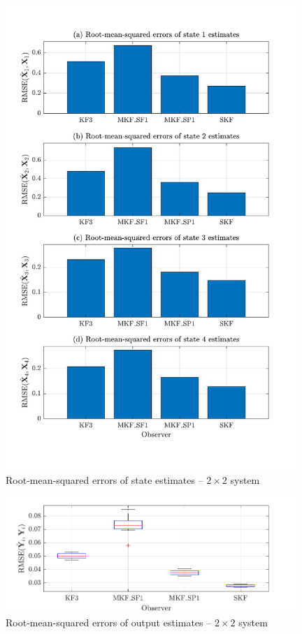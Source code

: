 \begin{figure}[htp]
	\centering
	\includegraphics[width=11cm]{images/rod_obs_sim2_all_seed_x_err_bar.pdf}
	\caption{Root-mean-squared errors of state estimates – $2\times2$ system}
	\label{fig:rod-obs-sim2-xest-RMSE-bar}
\end{figure}

\begin{figure}[htp]
	\centering
	\includegraphics[width=11cm]{images/rod_obs_sim2_all_seed_y_err_box.pdf}
	\caption{Root-mean-squared errors of output estimates – $2\times2$ system}
	\label{fig:rod-obs-sim2-yest-all-seed-RMSE-box}
\end{figure}

